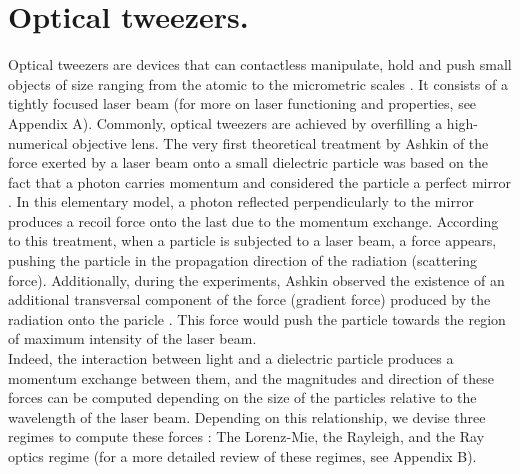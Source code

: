 \documentclass[letterpaper,12pt,oneside]{book}
\begin{document}
\section{Optical tweezers.}
Optical tweezers are devices that can contactless manipulate, hold and push small
objects of size ranging from the atomic to the micrometric scales \cite{jones2015optical}. It consists of a tightly focused laser beam  (for more on laser functioning and properties, see Appendix A).  Commonly, optical tweezers  are achieved by overfilling a high-numerical
objective lens. The very first theoretical treatment by Ashkin of the force exerted
by a laser beam onto a small dielectric particle was based on the fact that a photon
carries momentum and considered the particle a perfect mirror \cite{jones2015optical}. In this elementary model, a photon reflected perpendicularly to the mirror produces a recoil force onto the last due to the momentum exchange. According to this treatment, when a particle is subjected to a laser beam, a force appears, pushing the particle in the propagation direction of the radiation (scattering force). %
Additionally, during the experiments, Ashkin observed the existence of an additional transversal component of the
force (gradient force) produced by the radiation onto the paricle \cite{ashkinhistory}. This force would push the particle towards the region of maximum intensity of the laser beam.\\ Indeed,  the interaction between light and a dielectric particle produces a momentum
exchange between them, and the magnitudes and direction of these forces can be computed depending on the size of the particles relative to the wavelength of the laser
beam. Depending on this relationship, we devise three regimes to compute these forces \cite{jones2015optical}: The Lorenz-Mie, the Rayleigh, and the Ray optics regime (for a more detailed review of these regimes, see Appendix B).


\end{document}
